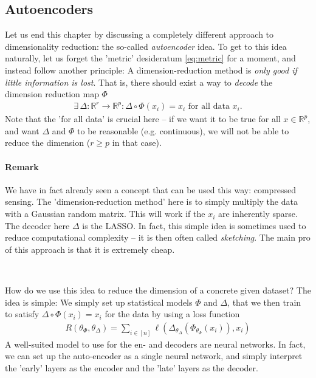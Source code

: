 \documentclass{article}
\newcommand{\R}{\mathbb{R}}
\begin{document}


\subsection{Autoencoders}
Let us end this chapter by discussing a completely different approach to dimensionality reduction: the so-called \emph{autoencoder} idea. To get to this idea naturally, let us forget the 'metric' desideratum \eqref{eq:metric} for a moment, and instead follow another principle: A dimension-reduction method is \emph{only good if little information is lost}. That is, there should exist a way to \emph{decode} the dimension reduction map $\Phi$
\begin{align*}
    \exists \, \Delta: \R^r \to \R^p : \Delta \circ \Phi(x_i) = x_i \text{ for all data $x_i$.}
\end{align*}
Note that the 'for all data' is crucial here -- if we want it to be true for all $x\in \R^p$, and want $\Delta$ and $\Phi$ to be reasonable (e.g. continuous), we will not be able to reduce the dimension ($r\geq p$ in that case).

\paragraph{Remark} We have in fact already seen a concept that can be used this way: compressed sensing. The 'dimension-reduction method' here is to simply multiply the data with a Gaussian random matrix. This will work if the $x_i$ are inherently sparse. The decoder here $\Delta$ is the LASSO. In fact, this simple idea is sometimes used to reduce computational complexity -- it is then often called \emph{sketching}. The main pro of this approach is that it is extremely cheap.

\

How do we use this idea to reduce the dimension of a concrete given dataset? The idea is simple: We simply set up statistical models $\Phi$ and $\Delta$, that we then train to satisfy $\Delta \circ \Phi(x_i)=x_i$ for the data by using a loss function
\begin{align*}
    R(\theta_\Phi,\theta_\Delta) = \sum_{i \in [n]}\ell(\Delta_{\theta_\Delta}(\Phi_{\theta_\Phi}(x_i)),x_i)
\end{align*} A well-suited model to use for the en- and decoders are neural networks. In fact, we can set up the auto-encoder as a single neural network, and simply interpret the 'early' layers as the encoder and the 'late' layers as the decoder. 
\end{document}
